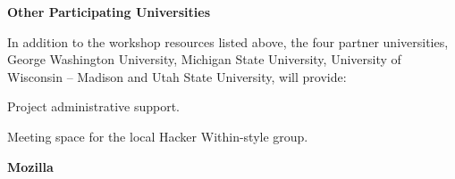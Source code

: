 \documentclass{proposalnsf}
\newlength{\up}
\begin{document}
\textbf{Other Participating Universities}

In addition to the workshop resources listed above, the four partner universities, George Washington University, Michigan State University, University of Wisconsin -- Madison and Utah State University, will provide: 
%
\begin{compactitem}
\item Project administrative support.
\item Meeting space for the local Hacker Within-style group.
\end{compactitem}

\textbf{Mozilla}

\begin{compactitem}
\item 
\end{compactitem}
\end{document}
